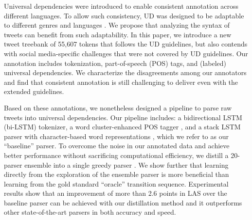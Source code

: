 \documentclass[11pt,a4paper]{article}
\newcommand{\yjcomment}[1]{\textcolor{orange}{[$_\mathrm{L}^\mathrm{Y}$#1]}}
\newcommand{\nascomment}[1]{\textcolor{blue}{[#1 ---\textsc{nas}]}}
\begin{document}

Universal dependencies \citep[UD]{NIVRE16.348} were introduced to enable
consistent annotation across different languages. To allow such
consistency, UD was designed to be adaptable to different genres \cite{wang-EtAl:2017:Long6} 
and languages \cite{guo-EtAl:2015:ACL-IJCNLP2,TACL892}. We propose that analyzing
the syntax of tweets can benefit from such adaptability. In this paper,
we introduce a new tweet treebank of 55,607 tokens that follows the UD
guidelines, but also contends with social media-specific challenges that were not
covered by UD guidelines. Our annotation includes 
tokenization, part-of-speech (POS) tags, and (labeled) universal dependencies.
We characterize the disagreements among our annotators and find that
consistent annotation is still challenging to deliver even with
the extended guidelines.


Based on these annotations, we nonetheless designed a pipeline to parse 
raw tweets into universal dependencies. Our pipeline includes: a
bidirectional LSTM (bi-LSTM) tokenizer, a word cluster-enhanced POS
tagger \citep[following][]{owoputi-EtAl:2013:NAACL-HLT}, and a stack LSTM parser
with character-based word representations
\cite{ballesteros-dyer-smith:2015:EMNLP}, which we refer to as our
``baseline'' parser.
To overcome the noise in our annotated data and achieve better performance
without sacrificing computational efficiency, we 
distill a 20-parser ensemble into a single greedy  parser 
\cite{DBLP:journals/corr/HintonVD15}.
We show further  that learning directly from the exploration of the ensemble parser
is more beneficial than learning from the gold standard ``oracle''
transition sequence. Experimental results show that an improvement of more
than 2.6 points in LAS over the
baseline parser can be achieved with our distillation method and it outperforms
other state-of-the-art parsers in both accuracy and speed.
\end{document}
